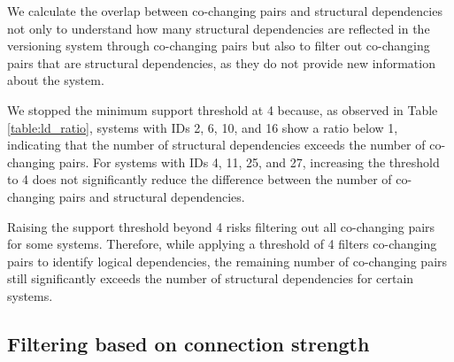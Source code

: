 We calculate the overlap between co-changing pairs and structural dependencies not only to understand how many structural dependencies are reflected in the versioning system through co-changing pairs but also to filter out co-changing pairs that are structural dependencies, as they do not provide new information about the system.

We stopped the minimum support threshold at 4 because, as observed in Table \ref{table:ld_ratio}, systems with IDs 2, 6, 10, and 16 show a ratio below 1, indicating that the number of structural dependencies exceeds the number of co-changing pairs. For systems with IDs 4, 11, 25, and 27, increasing the threshold to 4 does not significantly reduce the difference between the number of co-changing pairs and structural dependencies.

Raising the support threshold beyond 4 risks filtering out all co-changing pairs for some systems. Therefore, while applying a threshold of 4 filters co-changing pairs to identify logical dependencies, the remaining number of co-changing pairs still significantly exceeds the number of structural dependencies for certain systems.




\subsection{Filtering based on connection strength}
\label{subsec:filtering_connection_strength}

